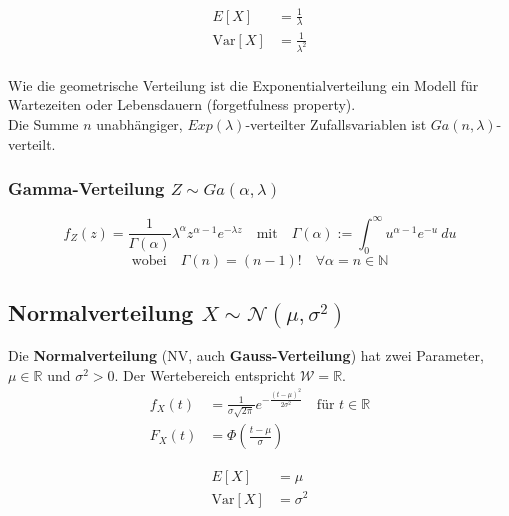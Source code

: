 \documentclass[11pt]{article}
\newcommand{\Var}{\text{Var}}
\begin{document}
\begin{equation*}
\begin{split}
	E[X] & = \frac{1}{\lambda} \\
	\Var[X] & = \frac{1}{\lambda^2} \\
\end{split}
\end{equation*}

Wie die geometrische Verteilung ist die Exponentialverteilung ein Modell f{\"u}r Wartezeiten oder Lebensdauern (forgetfulness property). \\
Die Summe $n$ unabh{\"a}ngiger, $Exp(\lambda)$-verteilter Zufallsvariablen ist $Ga(n, \lambda)$-verteilt.

\subsubsection{Gamma-Verteilung $Z \sim Ga(\alpha, \lambda)$}

\begin{equation*}
	f_Z(z) = \frac{1}{\Gamma (\alpha)}\lambda^\alpha z^{\alpha-1} e^{-\lambda z} \quad\text{mit}\quad \Gamma(\alpha) := \int_0^\infty u^{\alpha-1}e^{-u}\ du
\end{equation*}
\begin{equation*}
	\text{wobei}\quad \Gamma(n) = (n-1)! \quad \forall \alpha = n \in \mathbb{N}
\end{equation*}

\subsection{Normalverteilung $X \sim \mathcal{N}(\mu, \sigma^2)$}

Die \textbf{Normalverteilung} (NV, auch \textbf{Gauss-Verteilung}) hat zwei Parameter, $\mu \in \mathbb{R}$ und $\sigma^2 > 0$. Der Wertebereich entspricht $\mathcal{W} = \mathbb{R}$.
\begin{equation*}
\begin{split}
	f_X(t) & = \frac{1}{\sigma\sqrt{2\pi}}e^{-\frac{(t-\mu)^2}{2\sigma^2}}\quad\text{f{\"u}r } t \in \mathbb{R} \\
	F_X(t) & = \Phi(\frac{t-\mu}{\sigma})
\end{split}
\end{equation*}

\begin{equation*}
\begin{split}
	E[X] & = \mu \\
	\Var[X] & = \sigma^2 \\
\end{split}
\end{equation*}
\end{document}
